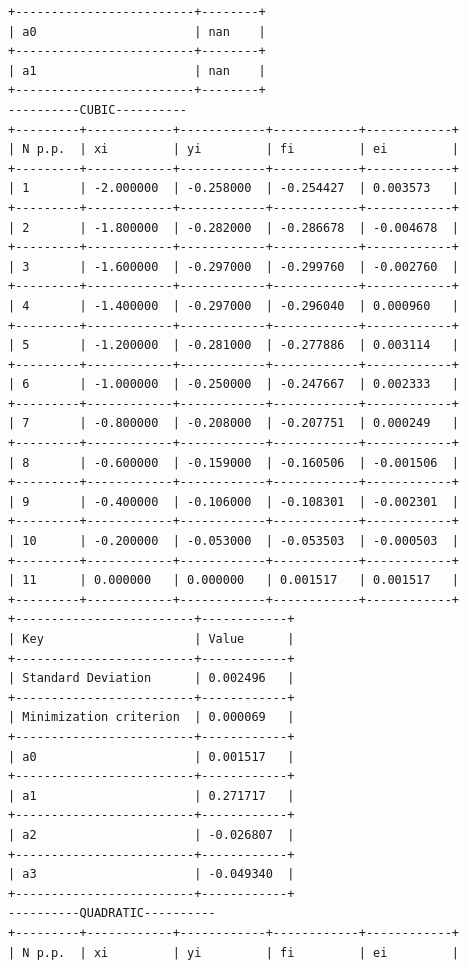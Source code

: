 \documentclass[12pt,one column]{article}
\begin{document}
\begin{verbatim}
+-------------------------+--------+
| a0                      | nan    | 
+-------------------------+--------+
| a1                      | nan    | 
+-------------------------+--------+
----------CUBIC----------
+---------+------------+------------+------------+------------+
| N p.p.  | xi         | yi         | fi         | ei         | 
+---------+------------+------------+------------+------------+
| 1       | -2.000000  | -0.258000  | -0.254427  | 0.003573   | 
+---------+------------+------------+------------+------------+
| 2       | -1.800000  | -0.282000  | -0.286678  | -0.004678  | 
+---------+------------+------------+------------+------------+
| 3       | -1.600000  | -0.297000  | -0.299760  | -0.002760  | 
+---------+------------+------------+------------+------------+
| 4       | -1.400000  | -0.297000  | -0.296040  | 0.000960   | 
+---------+------------+------------+------------+------------+
| 5       | -1.200000  | -0.281000  | -0.277886  | 0.003114   | 
+---------+------------+------------+------------+------------+
| 6       | -1.000000  | -0.250000  | -0.247667  | 0.002333   | 
+---------+------------+------------+------------+------------+
| 7       | -0.800000  | -0.208000  | -0.207751  | 0.000249   | 
+---------+------------+------------+------------+------------+
| 8       | -0.600000  | -0.159000  | -0.160506  | -0.001506  | 
+---------+------------+------------+------------+------------+
| 9       | -0.400000  | -0.106000  | -0.108301  | -0.002301  | 
+---------+------------+------------+------------+------------+
| 10      | -0.200000  | -0.053000  | -0.053503  | -0.000503  | 
+---------+------------+------------+------------+------------+
| 11      | 0.000000   | 0.000000   | 0.001517   | 0.001517   | 
+---------+------------+------------+------------+------------+
+-------------------------+------------+
| Key                     | Value      | 
+-------------------------+------------+
| Standard Deviation      | 0.002496   | 
+-------------------------+------------+
| Minimization criterion  | 0.000069   | 
+-------------------------+------------+
| a0                      | 0.001517   | 
+-------------------------+------------+
| a1                      | 0.271717   | 
+-------------------------+------------+
| a2                      | -0.026807  | 
+-------------------------+------------+
| a3                      | -0.049340  | 
+-------------------------+------------+
----------QUADRATIC----------
+---------+------------+------------+------------+------------+
| N p.p.  | xi         | yi         | fi         | ei         | 

\end{verbatim}
\end{document}
